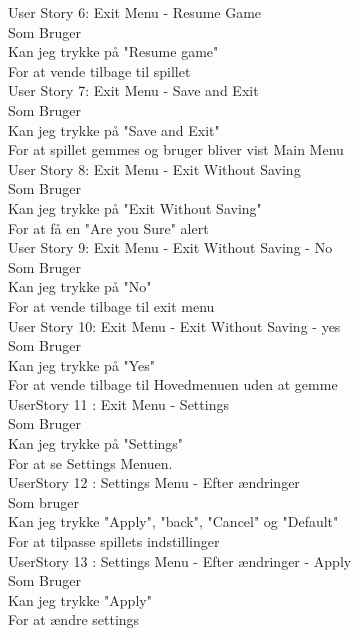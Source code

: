 User Story 6: Exit Menu - Resume Game\\
  Som Bruger \\
  Kan jeg trykke på "Resume game" \\
  For at vende tilbage til spillet\\

User Story 7: Exit Menu - Save and Exit\\
  Som Bruger \\
  Kan jeg trykke på "Save and Exit" \\
  For at spillet gemmes og bruger bliver vist Main Menu\\

User Story 8: Exit Menu - Exit Without Saving\\
  Som Bruger \\
  Kan jeg trykke på "Exit Without Saving"\\
  For at få en "Are you Sure" alert\\

User Story 9: Exit Menu - Exit Without Saving - No\\
  Som Bruger\\
  Kan jeg trykke på "No" \\
  For at vende tilbage til exit menu\\

User Story 10: Exit Menu - Exit Without Saving - yes\\
  Som Bruger\\
  Kan jeg trykke på "Yes" \\
  For at vende tilbage til Hovedmenuen uden at gemme\\

UserStory 11 : Exit Menu - Settings\\
  Som Bruger \\
  Kan jeg trykke på "Settings" \\
  For at se Settings Menuen.\\


UserStory 12 : Settings Menu - Efter ændringer\\
  Som bruger \\
  Kan jeg trykke "Apply", "back", "Cancel" og "Default"\\
  For at tilpasse spillets indstillinger\\

UserStory 13 : Settings Menu - Efter ændringer - Apply\\
  Som Bruger \\
  Kan jeg  trykke "Apply" \\
  For at ændre settings\\

